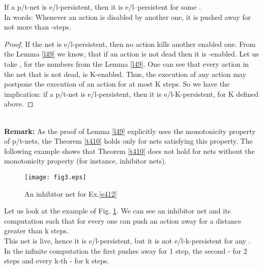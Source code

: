 \documentclass[a4paper]{llncs}
\begin{document}
\begin{theorem}
\label{t410}
If a p/t-net is e/l-persistent, then it is e/l--persistent for some .\\
In words: Whenever an action is disabled by another one, it is pushed away for not more than -steps.
\end{theorem}

\begin{proof}
If the net is e/l-persistent, then no action kills another enabled one. From the Lemma \ref{l49} we know, that if an action  is not dead then it is -enabled.
Let us take , for the numbers  from the Lemma \ref{l49}. One can see that every action in the net that is not dead, is K-enabled. Thus, the execution of any action may postpone the execution of an action  for at most K steps. 	
So we have the implication: if a p/t-net is e/l-persistent, then it is e/l-K-persistent, for K defined above. 	
\end{proof}
\mbox{ }\\
\textbf{Remark:} As the proof of Lemma \ref{l49} explicitly uses the monotonicity property of p/t-nets, the Theorem \ref{t410} holds only for nets satisfying this property. The following example shows that Theorem \ref{t410} does not hold for nets without the monotonicity property (for instance, inhibitor nets).

\begin{example}
\label{e412}

\begin{figure}[h]
\centering
\texttt{[image: fig3.eps]}
\caption{An inhibitor net for Ex.\ref{e412}}
\label{Fig3}
\end{figure}

Let us look at the example of Fig. \ref{Fig3}. We can see an inhibitor net and its computation such that for every  one can push an action away for a distance greater than k steps.\\
This net is live, hence it is e/l-persistent, but it is not e/l-k-persistent for any .\\
In the infinite computation  the first  pushes  away for 1 step, the second - for 2 steps and every k-th  - for k steps.
\end{example}
\end{document}
